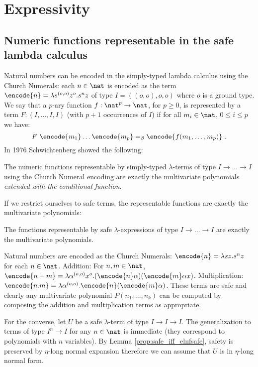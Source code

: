 \allowdisplaybreaks

\section{Expressivity}
\subsection{Numeric functions representable in the safe lambda
calculus}

Natural numbers can be encoded in the simply-typed lambda calculus
using the Church Numerals: each $n\in\nat$ is encoded as the term
$\encode{n} = \lambda s^{(o,o)} z^o. s^n z$ of type $I = ((o,o),o,o)$ where
$o$ is a ground type.
We say that a $p$-ary function $f : \nat^p \rightarrow \nat$, for $p \geq 0$,
is represented by a term $F : (I, \ldots, I, I)$ (with $p+1$ occurrences of $I$)
if for all $m_i \in \nat$, $0\leq i\leq p$ we have:
$$F~\encode{m_1} \ldots \encode{m_p} =_\beta \encode{f(m_1,\ldots, m_p)} \ .$$
In 1976 Schwichtenberg \cite{citeulike:622637}
showed the following:


\begin{theorem}[Schwichtenberg 1976]
The numeric functions representable by simply-typed $\lambda$-terms
of type $I\rightarrow \ldots \rightarrow I$ using the Church Numeral
encoding are exactly the multivariate polynomials \emph{extended
with the conditional function}.
\end{theorem}

If we restrict ourselves to safe terms, the representable functions
are exactly the multivariate polynomials:
\begin{theorem}
\label{thm:polychar} The functions representable by safe
$\lambda$-expressions of type $I\rightarrow \ldots \rightarrow I$
are exactly the multivariate polynomials.
\end{theorem}
\proof
  Natural numbers are encoded as the Church Numerals: $\encode{n} =
  \lambda s z. s^n z$ for each $n \in\nat$.  Addition: For $n,m \in \nat$, $\encode{n+m} =
  \lambda \alpha^{(o,o)} x^o . (\encode{n} \alpha) (\encode{m} \alpha
  x)$. Multiplication: $\encode{n . m} = \lambda \alpha^{(o,o)}
  . \encode{n} (\encode{m} \alpha)$. These terms are safe and
  clearly any multivariate polynomial $P(n_1, \ldots, n_k)$ can be
  computed by composing the addition and multiplication terms as
  appropriate.

For the converse, let $U$ be a safe $\lambda$-term of type
$I\rightarrow I\rightarrow I$.  The generalization to terms of type
$I^n \rightarrow I$ for any $n\in\nat$ is immediate (they correspond
to polynomials with $n$ variables). By Lemma
\ref{prop:safe_iff_elnfsafe}, safety is preserved by $\eta$-long
normal expansion therefore we can assume that $U$ is in $\eta$-long
normal form.


